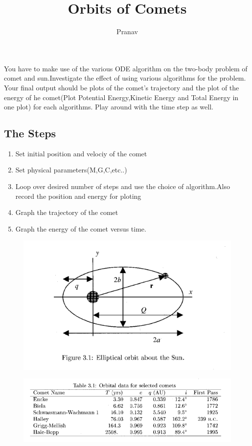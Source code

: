 \documentclass[10pt,a4paper]{article}
\author{Pranav}
\title{Orbits of Comets}
\begin{document}
\maketitle

You have to make use of the various ODE algorithm on the two-body problem of comet and sun.Investigate the effect of using various algorithms for the problem. Your final output should be plots of the comet's trajectory and the plot of the energy of he comet(Plot Potential Energy,Kinetic Energy and Total Energy in one plot) for each algorithms. Play around with the time step as well.

\subsection*{The Steps}
\begin{enumerate}
\item Set initial position and velociy of the comet
\item Set physical parameters(M,G,C,etc..)
\item Loop over desired number of steps and use the choice of algorithm.Also record the position and energy for ploting
\item Graph the trajectory of the comet
\item Graph the energy of the comet versus time.
\end{enumerate}


\begin{figure}
\centering
\includegraphics[scale=0.5]{cometorbit.png}
\end{figure}


\begin{figure}
\centering
\includegraphics[scale=0.5]{orbitdata.png}
\end{figure}
\end{document}
